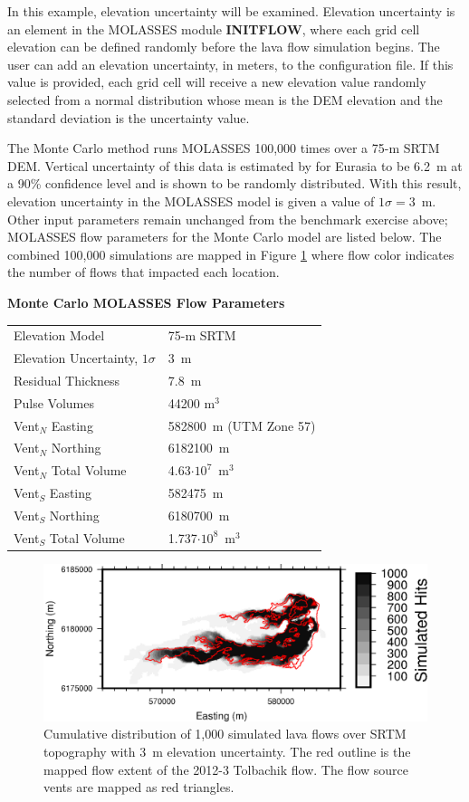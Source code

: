 \documentclass[12pt,letter]{article}
\begin{document}
		In this example, elevation uncertainty will be examined. Elevation uncertainty is an element in the MOLASSES module \textbf{INITFLOW}, where each grid cell elevation can be defined randomly before the lava flow simulation begins. The user can add an elevation uncertainty, in meters, to the configuration file. If this value is provided, each grid cell will receive a new elevation value randomly selected from a normal distribution whose mean is the DEM elevation and the standard deviation is the uncertainty value.
		
		The Monte Carlo method runs MOLASSES 100,000 times over a 75-m SRTM DEM. Vertical uncertainty of this data is estimated by \citet{rodriguez2006global} for Eurasia to be 6.2~m at a 90\% confidence level and is shown to be randomly distributed. With this result, elevation uncertainty in the MOLASSES model is given a value of $1\sigma=3$~m. Other input parameters remain unchanged from the benchmark exercise above; MOLASSES flow parameters for the Monte Carlo model are listed below. The combined 100,000 simulations are mapped in Figure \ref{fig:MC_map} where flow color indicates the number of flows that impacted each location.
		
		\begin{center}
			\textbf{Monte Carlo MOLASSES Flow Parameters}\\
			\begin{tabular}{l l}
				\toprule
				Elevation Model & 75-m SRTM\\
				Elevation Uncertainty, $1\sigma$ & 3~m\\
				Residual Thickness & 7.8~m\\
				Pulse Volumes & 44200 m$^3$\\
				\midrule
				Vent$_N$ Easting & 582800~m (UTM Zone 57)\\
				Vent$_N$ Northing & 6182100~m\\
				Vent$_N$ Total Volume & 4.63$\cdot10^7$~m$^3$\\
				\midrule
				Vent$_S$ Easting & 582475~m\\
				Vent$_S$ Northing & 6180700~m\\
				Vent$_S$ Total Volume & 1.737$\cdot10^8$~m$^3$\\
				\bottomrule
			\end{tabular}
		\end{center}

		\begin{figure}
			\centering
			\includegraphics[width=0.7\linewidth]{figures/MC_map}
			\caption{Cumulative distribution of 1,000 simulated lava flows over SRTM topography with 3~m elevation uncertainty. The red outline is the mapped flow extent of the 2012-3 Tolbachik flow. The flow source vents are mapped as red triangles.}
			\label{fig:MC_map}
		\end{figure}
				
\end{document}

